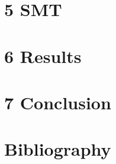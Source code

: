 \documentclass[]{article}
\begin{document}
\hypertarget{header-n273}{%
\section{5 SMT}\label{header-n273}}

\hypertarget{header-n274}{%
\section{6 Results}\label{header-n274}}

\hypertarget{header-n275}{%
\section{7 Conclusion}\label{header-n275}}

\hypertarget{header-n276}{%
\section{Bibliography}\label{header-n276}}
\end{document}
